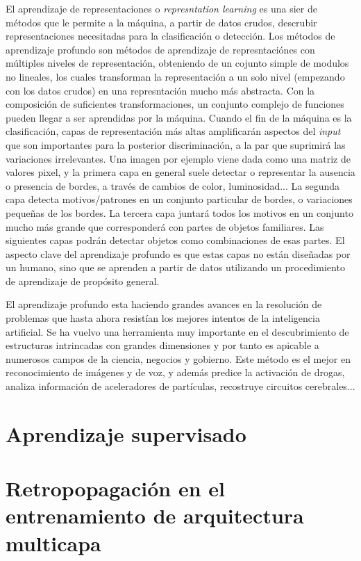 El aprendizaje de representaciones o \textit{represntation learning} es una sier de métodos que le permite a la máquina, a partir de datos crudos, descrubir representaciones necesitadas para la clasificación o detección. Los métodos de aprendizaje profundo son métodos de aprendizaje de represntaciónes con múltiples niveles de representación, obteniendo de un cojunto simple de modulos no lineales, los cuales transforman la representación a un solo nivel (empezando con los datos crudos) en una represntación mucho más abstracta. Con la composición de suficientes transformaciones, un conjunto complejo de funciones pueden llegar a ser aprendidas por la máquina. Cuando el fin de la máquina es la clasificación, capas de representación más altas amplificarán aspectos del \textit{input} que son importantes para la posterior discriminación, a la par que suprimirá las variaciones irrelevantes. Una imagen por ejemplo viene dada como una matriz de valores pixel, y la primera capa en general suele detectar o representar la ausencia o presencia de bordes, a través de cambios de color, luminosidad... La segunda capa detecta motivos/patrones en un conjunto particular de bordes, o variaciones pequeñas de los bordes. La tercera capa juntará todos los motivos en un conjunto mucho más grande que corresponderá con partes de objetos familiares. Las siguientes capas podrán detectar objetos como combinaciones de esas partes. El aspecto clave del aprendizaje profundo es que estas capas no están diseñadas por un humano, sino que se aprenden a partir de datos utilizando un procedimiento de aprendizaje de propósito general.

El aprendizaje profundo esta haciendo grandes avances en la resolución de problemas que hasta ahora resistían los mejores intentos de la inteligencia artificial. Se ha vuelvo una herramienta muy importante en el descubrimiento de estructuras intrincadas con grandes dimensiones y por tanto es apicable a numerosos campos de la ciencia, negocios y gobierno. Este método es el mejor en reconocimiento de imágenes y de voz, y además predice la activación de drogas, analiza información de aceleradores de partículas, recostruye circuitos cerebrales... 

\section{Aprendizaje supervisado}

\section{Retropopagación en el entrenamiento de arquitectura multicapa}

